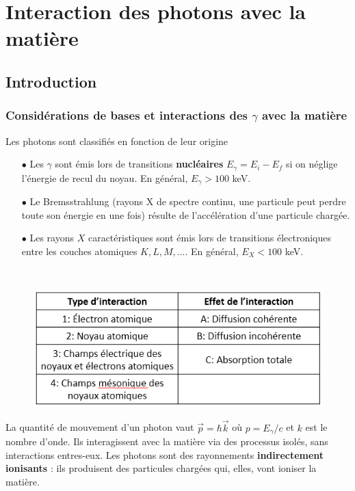 \chapter{Interaction des photons avec la matière}
\section{Introduction}
\subsection{Considérations de bases et interactions des $\gamma$ avec la matière}
Les photons sont classifiés en fonction de leur origine
\begin{itemize}
\item[$\bullet$] Les $\gamma$ sont émis lors de transitions \textbf{nucléaires} $E_\gamma = 
E_i-E_f$ si on néglige l'énergie de recul du noyau. En général, $E_\gamma > 100$ keV.
\item[$\bullet$] Le Bremsstrahlung (rayons X de spectre continu, une particule peut perdre toute
son énergie en une fois) résulte de l'accélération d'une particule chargée.
\item[$\bullet$] Les rayons $X$ caractéristiques sont émis lors de transitions électroniques entre les couches atomiques $K, L, M, \dots$. En général, $E_X < 100$ keV.
\end{itemize}\ \\

	\begin{figure}
	\vspace{-5mm}
	\includegraphics[scale=0.5]{ch4/image1}
	\end{figure}
La quantité de mouvement d'un photon vaut $\vec p = \hbar\vec{k}$ où $p = E_\gamma/c$ et $k$ est le
nombre d'onde. Ils interagissent avec la matière via des processus isolés, sans interactions entres-eux. 
Les photons sont des rayonnements \textbf{indirectement ionisants} : ils produisent des particules 
chargées qui, elles, vont ioniser la matière.\\


